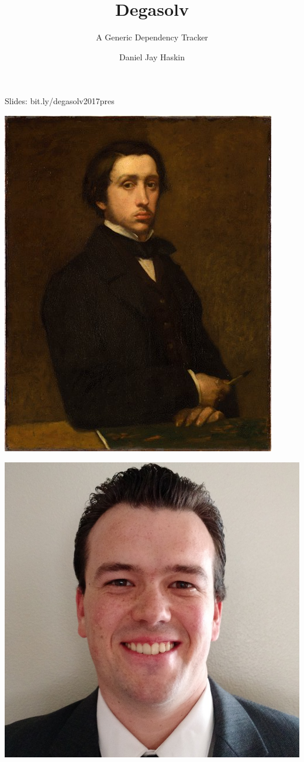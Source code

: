 \documentclass{beamer}
\title{Degasolv}
\subtitle{A Generic Dependency Tracker }
\author{Daniel Jay Haskin}
\begin{document}
\begin{frame}
  \titlepage
    \centerline{\footnotesize{Slides: bit.ly/degasolv2017pres}}
\end{frame}
\begin{frame}
  \centerline{\includegraphics[scale=0.5]{Edgar_Degas_self_portrait_1855.jpeg}}
\end{frame}
\begin{frame}
  \centerline{\includegraphics[scale=0.15]{DanielHaskin-small.jpg}}
\end{frame}
\end{document}
